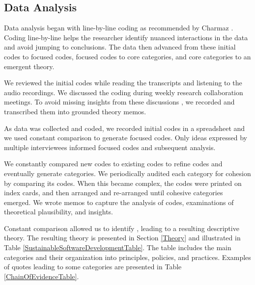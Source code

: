 \subsection{Data Analysis}
Data analysis began with line-by-line coding as recommended by Charmaz \cite{Charmaz}. Coding line-by-line helps the researcher identify nuanced interactions in the data and avoid jumping to conclusions. The data then advanced from these initial codes to focused codes, focused codes to core categories, and core categories to an emergent theory. 

We reviewed the initial codes while reading the transcripts and listening to the audio recordings. We discussed the coding during weekly research collaboration meetings. To avoid missing insights from these discussions \cite{GlaserTheoreticalSensitivity}, we recorded and transcribed them into grounded theory memos. 

As data was collected and coded, we recorded initial codes in a spreadsheet and we used constant comparison to generate focused codes. Only ideas expressed by multiple interviewees informed focused codes and subsequent analysis.

We constantly compared new codes to existing codes to refine codes and eventually generate categories. We periodically audited each category for cohesion by comparing its codes. When this became complex, the codes were printed on index cards, and then arranged and re-arranged until cohesive categories emerged. We wrote memos to capture the analysis of codes, examinations of theoretical plausibility, and insights. 

Constant comparison allowed us to identify  \cite{GlaserBasics}, leading to a resulting descriptive theory. The resulting theory is presented in Section \ref{Theory} and illustrated in Table \ref{SustainableSoftwareDevelopmentTable}. The table includes the main categories and their organization into principles, policies, and practices. Examples of quotes leading to some categories are presented in Table \ref{ChainOfEvidenceTable}.


